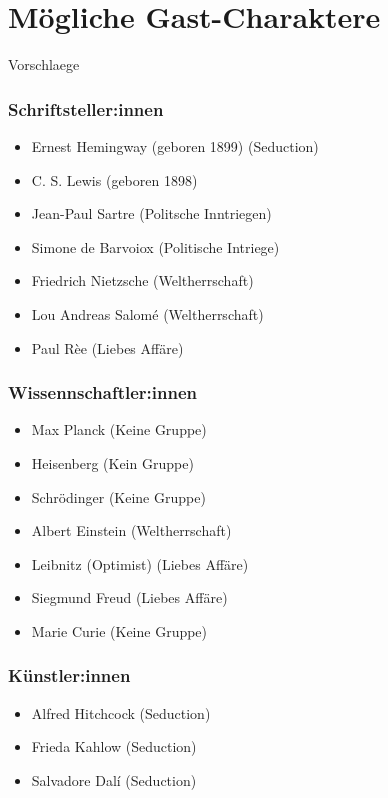 \documentclass[12pt, a4paper, openany]{report}
\begin{document}
\section{Mögliche Gast-Charaktere}
Vorschlaege 
\subsubsection{Schriftsteller:innen}
\begin{itemize}
    	\item Ernest Hemingway (geboren 1899) (Seduction)
    	\item C. S. Lewis (geboren 1898) 
    	\item Jean-Paul Sartre (Politsche Inntriegen)
    	\item Simone de Barvoiox (Politische Intriege)
    	\item Friedrich Nietzsche (Weltherrschaft)
    	\item Lou Andreas Salomé (Weltherrschaft)
    	\item Paul Rèe (Liebes Affäre)
\end{itemize}

\subsubsection{Wissennschaftler:innen}
\begin{itemize}
	\item Max Planck (Keine Gruppe)
    	\item Heisenberg (Kein Gruppe) 
    	\item Schrödinger (Keine Gruppe)
    	\item Albert Einstein (Weltherrschaft)
	\item Leibnitz (Optimist) (Liebes Affäre)
	\item Siegmund Freud (Liebes Affäre)
	\item Marie Curie (Keine Gruppe)
\end{itemize}

\subsubsection{Künstler:innen}
\begin{itemize}
	\item Alfred Hitchcock (Seduction)
	\item Frieda Kahlow (Seduction)
	\item Salvadore Dalí (Seduction)
\end{itemize}
\end{document}
